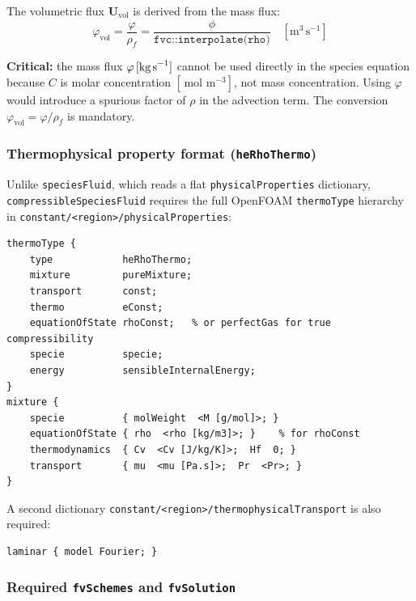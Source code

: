 \documentclass[11pt,a4paper]{article}
\newcommand{\mol}{\,\text{mol}}
\newcommand{\m}{\,\text{m}}
\begin{document}
The volumetric flux $\mathbf{U}_\text{vol}$ is derived from the mass flux:
\begin{equation}\label{eq:phiU}
  \varphi_\text{vol} = \frac{\varphi}{\rho_f}
  = \frac{\phi}{\texttt{fvc::interpolate(rho)}}
  \quad [\text{m}^3\,\text{s}^{-1}]
\end{equation}

\begin{tcolorbox}[notebox]
\textbf{Critical:} the mass flux $\varphi\,[\text{kg\,s}^{-1}]$ cannot be used
directly in the species equation because $C$ is molar concentration
$[\mol\,\m^{-3}]$, not mass concentration.  Using $\varphi$ would introduce a
spurious factor of $\rho$ in the advection term.  The conversion
$\varphi_\text{vol} = \varphi/\rho_f$ is mandatory.
\end{tcolorbox}

\subsubsection{Thermophysical property format (\texttt{heRhoThermo})}

Unlike \texttt{speciesFluid}, which reads a flat \texttt{physicalProperties}
dictionary, \texttt{compressibleSpeciesFluid} requires the full OpenFOAM
\texttt{thermoType} hierarchy in \texttt{constant/<region>/physicalProperties}:

\begin{verbatim}
thermoType {
    type            heRhoThermo;
    mixture         pureMixture;
    transport       const;
    thermo          eConst;
    equationOfState rhoConst;   % or perfectGas for true compressibility
    specie          specie;
    energy          sensibleInternalEnergy;
}
mixture {
    specie          { molWeight  <M [g/mol]>; }
    equationOfState { rho  <rho [kg/m3]>; }    % for rhoConst
    thermodynamics  { Cv  <Cv [J/kg/K]>;  Hf  0; }
    transport       { mu  <mu [Pa.s]>;  Pr  <Pr>; }
}
\end{verbatim}

A second dictionary \texttt{constant/<region>/thermophysicalTransport} is also
required:
\begin{verbatim}
laminar { model Fourier; }
\end{verbatim}

\subsubsection{Required \texttt{fvSchemes} and \texttt{fvSolution}}
\end{document}
